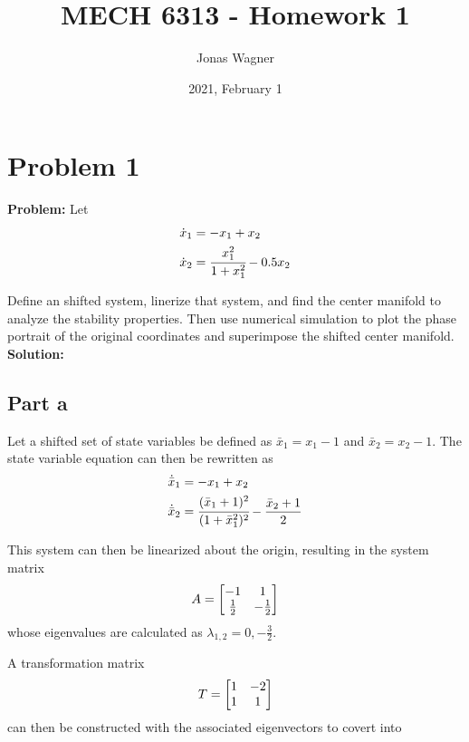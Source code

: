 \documentclass[letter]{article}
\title{MECH 6313 - Homework 1}
\author{Jonas Wagner}
\date{2021, February 1}
\begin{document}
\maketitle


\section{Problem 1}
\textbf{Problem:}
Let
\begin{equation}
	\begin{aligned}
		\dot{x}_1 &= -x_1 + x_2\\
		\dot{x}_2 &= \cfrac{x_1^2}{1 + x_1^2} - 0.5 x_2
	\end{aligned}
\end{equation}

Define an shifted system, linerize that system, and find the center manifold to analyze the stability properties. Then use numerical simulation to plot the phase portrait of the original coordinates and superimpose the shifted center manifold.\\

\textbf{Solution:}
\subsection{Part a}
Let a shifted set of state variables be defined as $\bar{x}_1 = x_1 - 1$ and $\bar{x}_2 = x_2 - 1$. The state variable equation can then be rewritten as
\begin{equation}
	\begin{aligned}
		\dot{\bar{x}}_1 &= -x_1 + x_2\\
		\dot{\bar{x}}_2 &= \cfrac{(\bar{x}_1+1)^2}{(1 + \bar{x}_1^2)^2} - \frac{\bar{x}_2 + 1}{2}
	\end{aligned}
\end{equation}

This system can then be linearized about the origin, resulting in the system matrix
\begin{equation}
	A = \mqty[-1 & 1\\ \frac{1}{2} & -\frac{1}{2}]
\end{equation}
whose eigenvalues are calculated as $\lambda_{1,2} = 0, -\frac{3}{2}$.

A transformation matrix $$T = \mqty[1&-2\\1&1]$$ can then be constructed with the associated eigenvectors to covert into 
\end{document}
